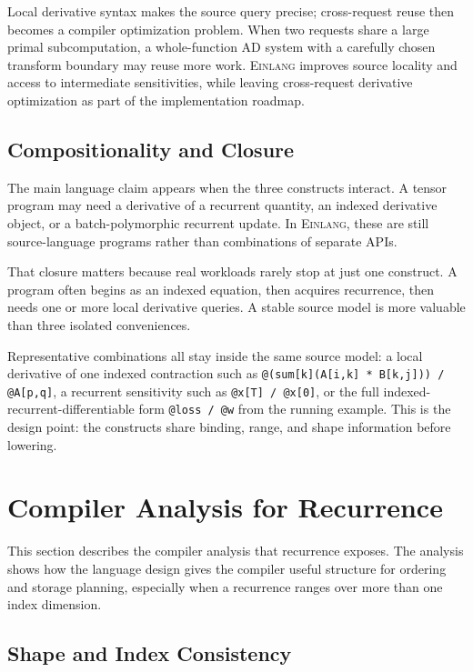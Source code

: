 \documentclass[sigplan,screen,nonacm]{acmart}
\newcommand{\einlang}{\textsc{Einlang}}
\begin{document}
Local derivative syntax makes the source query precise; cross-request reuse then becomes a compiler optimization problem. When two requests share a large primal subcomputation, a whole-function AD system with a carefully chosen transform boundary may reuse more work. \einlang{} improves source locality and access to intermediate sensitivities, while leaving cross-request derivative optimization as part of the implementation roadmap.

\subsection{Compositionality and Closure}

The main language claim appears when the three constructs interact. A tensor program may need a derivative of a recurrent quantity, an indexed derivative object, or a batch-polymorphic recurrent update. In \einlang{}, these are still source-language programs rather than combinations of separate APIs.

That closure matters because real workloads rarely stop at just one construct. A program often begins as an indexed equation, then acquires recurrence, then needs one or more local derivative queries. A stable source model is more valuable than three isolated conveniences.

Representative combinations all stay inside the same source model: a local derivative of one indexed contraction such as \texttt{@(sum[k](A[i,k] * B[k,j])) / @A[p,q]}, a recurrent sensitivity such as \texttt{@x[T] / @x[0]}, or the full indexed-recurrent-differentiable form \texttt{@loss / @w} from the running example. This is the design point: the constructs share binding, range, and shape information before lowering.

\section{Compiler Analysis for Recurrence}

This section describes the compiler analysis that recurrence exposes. The analysis shows how the language design gives the compiler useful structure for ordering and storage planning, especially when a recurrence ranges over more than one index dimension.

\subsection{Shape and Index Consistency}
\end{document}
